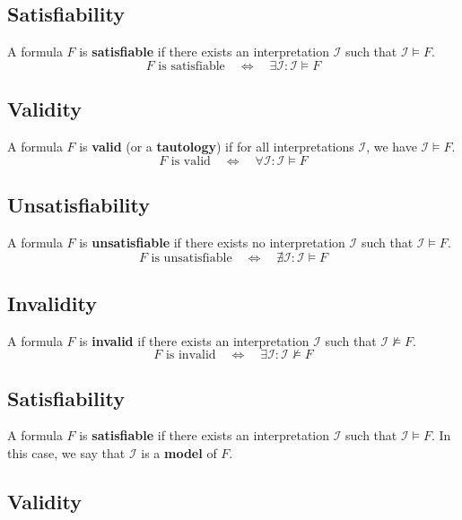 \documentclass[11pt,a4paper]{article}
\theoremstyle{definition}
\theoremstyle{plain}
\theoremstyle{remark}
\begin{document}
\begin{tcolorbox}[colback=red!5!white,colframe=red!75!black,title=\textbf{Semantic Properties of Formulas}]
\subsection*{Satisfiability}
A formula $F$ is \textbf{satisfiable} if there exists an interpretation $\mathcal{I}$ such that $\mathcal{I} \models F$.
\[
F \text{ is satisfiable} \quad \Leftrightarrow \quad \exists \mathcal{I} : \mathcal{I} \models F
\]

\subsection*{Validity}
A formula $F$ is \textbf{valid} (or a \textbf{tautology}) if for all interpretations $\mathcal{I}$, we have $\mathcal{I} \models F$.
\[
F \text{ is valid} \quad \Leftrightarrow \quad \forall \mathcal{I} : \mathcal{I} \models F
\]

\subsection*{Unsatisfiability}
A formula $F$ is \textbf{unsatisfiable} if there exists no interpretation $\mathcal{I}$ such that $\mathcal{I} \models F$.
\[
F \text{ is unsatisfiable} \quad \Leftrightarrow \quad \nexists \mathcal{I} : \mathcal{I} \models F
\]

\subsection*{Invalidity}
A formula $F$ is \textbf{invalid} if there exists an interpretation $\mathcal{I}$ such that $\mathcal{I} \not\models F$.
\[
F \text{ is invalid} \quad \Leftrightarrow \quad \exists \mathcal{I} : \mathcal{I} \not\models F
\]
\end{tcolorbox}

\subsection{Satisfiability}

A formula $F$ is \textbf{satisfiable} if there exists an interpretation $\mathcal{I}$ such that $\mathcal{I} \models F$. In this case, we say that $\mathcal{I}$ is a \textbf{model} of $F$.

\subsection{Validity}
\end{document}
